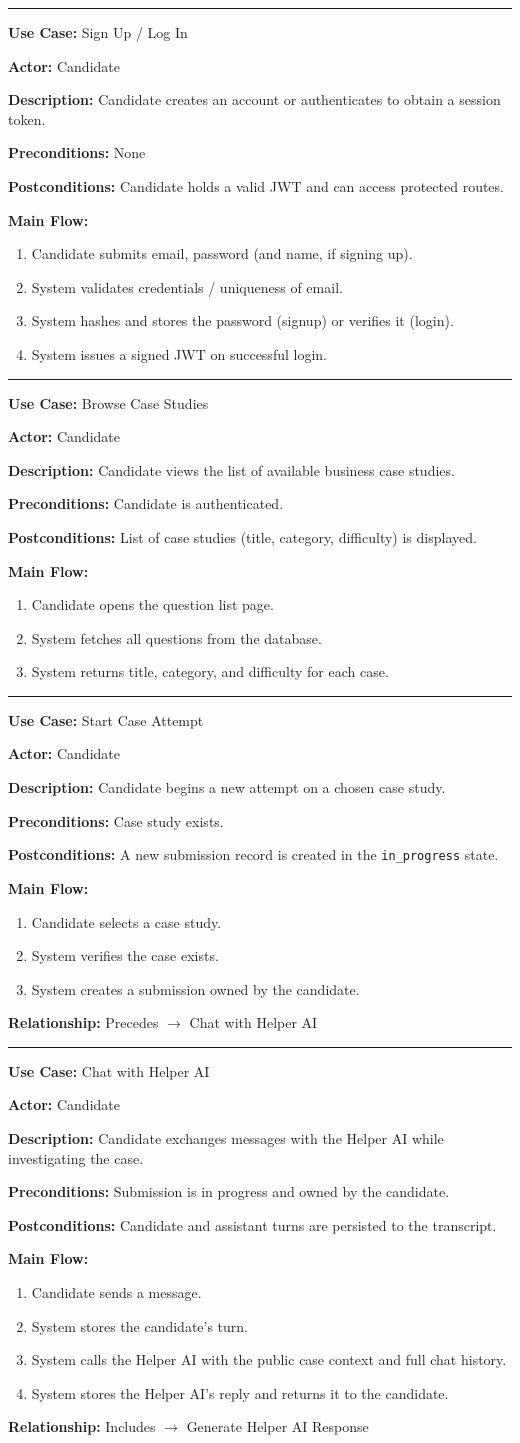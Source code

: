 \documentclass[11pt]{article}
\newcommand{\ucbox}[6]{%
  \noindent\rule{\linewidth}{0.5pt}\par
  \textbf{Use Case:} #1\par
  \textbf{Actor:} #2\par
  \textbf{Description:} #3\par
  \textbf{Preconditions:} #4\par
  \textbf{Postconditions:} #5\par
  \textbf{Main Flow:}\par
  #6
}
\begin{document}
\ucbox{Sign Up / Log In}{Candidate}
{Candidate creates an account or authenticates to obtain a session token.}
{None}
{Candidate holds a valid JWT and can access protected routes.}
{
\begin{enumerate}[nosep]
  \item Candidate submits email, password (and name, if signing up).
  \item System validates credentials / uniqueness of email.
  \item System hashes and stores the password (signup) or verifies it (login).
  \item System issues a signed JWT on successful login.
\end{enumerate}
}

\vspace{0.3cm}
\ucbox{Browse Case Studies}{Candidate}
{Candidate views the list of available business case studies.}
{Candidate is authenticated.}
{List of case studies (title, category, difficulty) is displayed.}
{
\begin{enumerate}[nosep]
  \item Candidate opens the question list page.
  \item System fetches all questions from the database.
  \item System returns title, category, and difficulty for each case.
\end{enumerate}
}

\vspace{0.3cm}
\ucbox{Start Case Attempt}{Candidate}
{Candidate begins a new attempt on a chosen case study.}
{Case study exists.}
{A new submission record is created in the \texttt{in\_progress} state.}
{
\begin{enumerate}[nosep]
  \item Candidate selects a case study.
  \item System verifies the case exists.
  \item System creates a submission owned by the candidate.
\end{enumerate}
}
\textbf{Relationship:} Precedes $\rightarrow$ Chat with Helper AI

\vspace{0.3cm}
\ucbox{Chat with Helper AI}{Candidate}
{Candidate exchanges messages with the Helper AI while investigating the case.}
{Submission is in progress and owned by the candidate.}
{Candidate and assistant turns are persisted to the transcript.}
{
\begin{enumerate}[nosep]
  \item Candidate sends a message.
  \item System stores the candidate's turn.
  \item System calls the Helper AI with the public case context and full chat history.
  \item System stores the Helper AI's reply and returns it to the candidate.
\end{enumerate}
}
\textbf{Relationship:} Includes $\rightarrow$ Generate Helper AI Response
\end{document}
